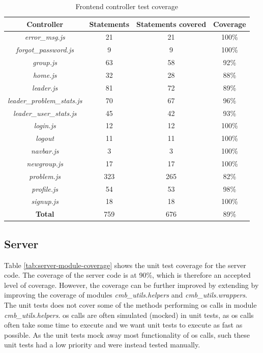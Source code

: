 \begin{table}[t!]
    \centering
    \begin{tabular}{c c c c}
      \hline
      \textbf{Controller} & \textbf{Statements} & \textbf{Statements covered} & \textbf{Coverage} \\ \hline
      \textit{error\_msg.js} & 21 & 21 & 100\% \\
      \textit{forgot\_password.js} & 9 & 9 & 100\% \\
      \textit{group.js} & 63 & 58 & 92\% \\
      \textit{home.js} & 32 & 28 & 88\% \\
      \textit{leader.js} & 81 & 72 & 89\% \\
      \textit{leader\_problem\_stats.js} & 70 & 67 & 96\% \\
      \textit{leader\_user\_stats.js} & 45 & 42 & 93\% \\
      \textit{login.js} & 12 & 12 & 100\% \\
      \textit{logout} & 11 & 11 & 100\% \\
      \textit{navbar.js} & 3 & 3 & 100\% \\
      \textit{newgroup.js} & 17 & 17 & 100\% \\
      \textit{problem.js} & 323 & 265 & 82\% \\
      \textit{profile.js} & 54 & 53 & 98\% \\
      \textit{signup.js} & 18 & 18 & 100\% \\ \hline
      \textbf{Total} & 759 & 676 & 89\% \\ \hline
    \end{tabular}
    \caption{Frontend controller test coverage}
    \label{tab:frontend-coverage-controllers}
\end{table}

\subsection{Server}
Table \ref{tab:server-module-coverage} shows the unit test coverage for the server code. The coverage of the server code is at 90\%, which is therefore an accepted level of coverage. However, the coverage can be further improved by extending by improving the coverage of modules \textit{cmb\_utils.helpers} and \textit{cmb\_utils.wrappers}. \\

The unit tests does not cover some of the methods performing \gls{os} calls in module \textit{cmb\_utils.helpers}. \gls{os} calls are often simulated (mocked) in unit tests, as \gls{os} calls often take some time to execute and we want unit tests to execute as fast as possible. As the unit tests mock away most functionality of \gls{os} calls, such these unit tests had a low priority and were instead tested manually. \\

